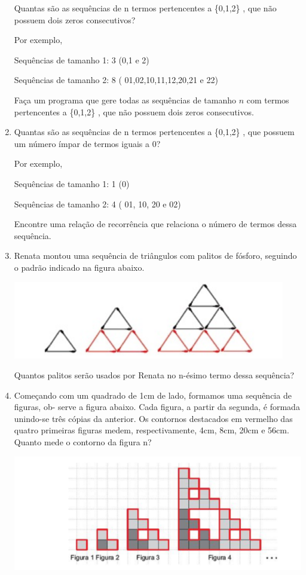 \begin{enumerate}
Quantas são as sequências de n termos pertencentes a \{0,1,2\} , que não possuem dois zeros consecutivos?

Por exemplo,

Sequências de tamanho 1: 3 (0,1 e 2) 

Sequências de tamanho 2: 8 ( 01,02,10,11,12,20,21 e 22)

Faça um programa que gere todas as sequências de tamanho $n$ com termos pertencentes  a \{0,1,2\} , que não possuem dois zeros consecutivos.


\item 

Quantas são as sequências de n termos pertencentes a \{0,1,2\} , que possuem um número ímpar de termos iguais a 0?

Por exemplo,

Sequências de tamanho 1: 1 (0) 

Sequências de tamanho 2: 4 ( 01, 10, 20 e 02)

Encontre uma relação de recorrência que relaciona o número de termos dessa sequência.

\item 

Renata montou uma sequência de triângulos com palitos de fósforo, seguindo o padrão indicado na figura abaixo.

\begin{center}
\includegraphics[width=1.0\linewidth,scale=0.8]{images/palitos.png} 
\end{center}

Quantos palitos serão usados por Renata no n-ésimo termo dessa sequência?

\item
Começando com um quadrado de 1cm de lado, formamos uma sequência de figuras, ob-
serve a figura abaixo. Cada figura, a partir da segunda, é formada unindo-se três cópias
da anterior. Os contornos destacados em vermelho das quatro primeiras figuras medem,
respectivamente, 4cm, 8cm, 20cm e 56cm. Quanto mede o contorno da figura n?


\begin{center}
\includegraphics[width=1.0\linewidth,scale=0.8]{images/figura_recursiva.png} 
\end{center}


\end{enumerate}
